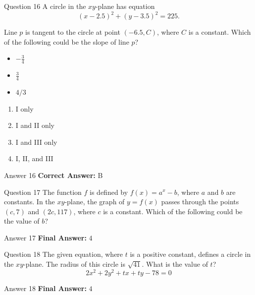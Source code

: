 \documentclass{beamer}
\begin{document}
\begin{frame}{Question 16}
\small
A circle in the \(xy\)-plane has equation  
\[
(x - 2.5)^2 + (y - 3.5)^2 = 225.
\]

Line \(p\) is tangent to the circle at point \((-6.5, C)\), where \(C\) is a constant.  
Which of the following could be the slope of line \(p\)?

\begin{itemize}
    \item[I.] \(-\frac{3}{4}\)
    \item[II.] \(\frac{3}{4}\)
    \item[III.] \(4/3\)
\end{itemize}
\vspace{0.35cm}
\begin{enumerate}
    \item[A.] I only
    \item[B.] I and II only
    \item[C.] I and III only
    \item[D.] I, II, and III
\end{enumerate}
\end{frame}
\begin{frame}{Answer 16}
\small
\textbf{Correct Answer:} B
\end{frame}

\begin{frame}{Question 17}
\small
The function \(f\) is defined by \(f(x) = a^x - b\), where \(a\) and \(b\) are constants.  
In the \(xy\)-plane, the graph of \(y = f(x)\) passes through the points \((c, 7)\) and \((2c, 117)\), where \(c\) is a constant.  
Which of the following could be the value of \(b\)?
\end{frame}
\begin{frame}{Answer 17}
\small
\textbf{Final Answer:} $\boxed{4}$
\end{frame}

\begin{frame}{Question 18}
\small
The given equation, where \(t\) is a positive constant, defines a circle in the \(xy\)-plane.  
The radius of this circle is \(\sqrt{41}\).  
What is the value of \(t\)?  
\[
2x^2 + 2y^2 + tx + ty - 78 = 0
\]
\end{frame}
\begin{frame}{Answer 18}
\small
\textbf{Final Answer:} $\boxed{4}$
\end{frame}
\end{document}
